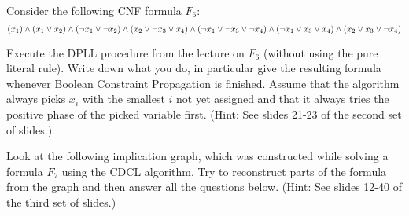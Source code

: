 \documentclass[addpoints,12pt]{exam}
\begin{document}
\begin{questions}


\newpage
\question[20]
\vspace*{5pt}

Consider the following CNF formula $F_6$:
\[(x_1) \land (x_1 \lor x_2) \land (\neg x_1 \lor \neg x_2) \land (x_2 \lor \neg x_3 \lor x_4) \\
\land (\neg x_1 \lor \neg x_3 \lor \neg x_4) \land (\neg x_1 \lor x_3 \lor x_4) \land (x_2 \lor x_3 \lor \neg x_4)\]

Execute the DPLL procedure from the lecture on $F_6$ (without using the pure literal rule).
Write down what you do, in particular give the
resulting formula whenever Boolean Constraint Propagation is finished. Assume that the
algorithm always picks  $x_i$ with the smallest $i$ not yet assigned and that it always tries
the positive phase of the picked variable first.
(Hint: See slides 21-23 of the second set of slides.)

\newpage
\question[20]
\vspace*{5pt}

Look at the following implication graph, which was constructed while solving a formula $F_7$ using the CDCL algorithm.
Try to reconstruct parts of the formula from the graph and then answer all the questions below.
(Hint: See slides 12-40 of the third set of slides.)
\vspace*{10pt}


\end{questions}
\end{document}
